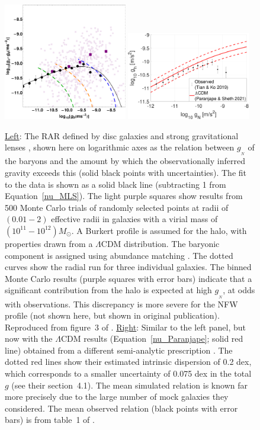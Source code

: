\documentclass[fleqn,usenatbib,useAMS]{mnras} %
\begin{document}
\begin{figure}
	\centering
	\includegraphics[width=0.48\textwidth]{Tian_2019_Figure_3_AUTHOR_Burkert_HAR}
	\hfill
	\includegraphics[width=0.48\textwidth]{Halo_acceleration_comparison}
	\caption{\underline{Left}: The RAR defined by disc galaxies and strong gravitational lenses \citep[Section~\ref{Strong_lensing}; see also][]{Tian_2017}, shown here on logarithmic axes as the relation between $g_{_N}$ of the baryons and the amount by which the observationally inferred gravity exceeds this (solid black points with uncertainties). The fit to the data is shown as a solid black line (subtracting 1 from Equation~\ref{nu_MLS}). The light purple squares show results from 500 Monte Carlo trials of randomly selected points at radii of $\left(0.01-2\right)$ effective radii in galaxies with a virial mass of $\left(10^{11} - 10^{12}\right) M_\odot$. A Burkert profile is assumed for the halo, with properties drawn from a $\Lambda$CDM distribution. The baryonic component is assigned using abundance matching \citep{Behroozi_2013_AM}. The dotted curves show the radial run for three individual galaxies. The binned Monte Carlo results (purple squares with error bars) indicate that a significant contribution from the halo is expected at high $g_{_N}$, at odds with observations. This discrepancy is more severe for the NFW profile (not shown here, but shown in original publication). Reproduced from figure~3 of \citet{Tian_2019}. \underline{Right}: Similar to the left panel, but now with the $\Lambda$CDM results (Equation~\ref{nu_Paranjape}; solid red line) obtained from a different semi-analytic prescription \citep{Paranjape_2021}. The dotted red lines show their estimated intrinsic dispersion of 0.2 dex, which corresponds to a smaller uncertainty of 0.075 dex in the total $g$ (see their section~4.1). The mean simulated relation is known far more precisely due to the large number of mock galaxies they considered. The mean observed relation (black points with error bars) is from table~1 of \citet{Tian_2019}.}
	\label{Tian_2019_Figure_3}
\end{figure}
\end{document}
